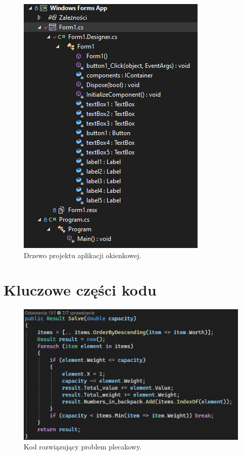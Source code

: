 \documentclass{report}
\begin{document}
\begin{figure}[H]%
	\centering
	\includegraphics[scale=0.6]{zdj/form_drzewo}
	\caption{Drzewo projektu aplikacji okienkowej.}
\end{figure}

\chapter{Kluczowe części kodu}

\begin{figure}[H]%
	\centering
	\includegraphics[scale=0.6]{zdj/algorytm_zachlanny}
	\caption{Kod rozwiązujący problem plecakowy.}
\end{figure}
\end{document}
